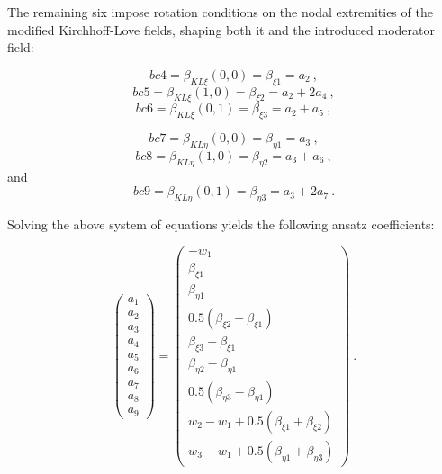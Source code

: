 The remaining six impose rotation conditions on the nodal extremities of the modified Kirchhoff-Love fields, shaping both it and the introduced moderator field:

\begin{equation} 
bc4 = \beta_{KL \xi}(0,0) = \beta_{\xi 1} = a_2
\label{eqDSGc3_14}\ ,
\end{equation}
\begin{equation} 
bc5 = \beta_{KL \xi}(1,0) = \beta_{\xi 2} = a_2 + 2a_4
\label{eqDSGc3_15}\ ,
\end{equation}
\begin{equation} 
bc6 = \beta_{KL \xi}(0,1) = \beta_{\xi 3} = a_2 + a_5
\label{eqDSGc3_16}\ ,
\end{equation}

\begin{equation} 
bc7 = \beta_{KL \eta}(0,0) = \beta_{\eta 1} = a_3
\label{eqDSGc3_17}\ ,
\end{equation}
\begin{equation} 
bc8 = \beta_{KL \eta}(1,0) = \beta_{\eta 2} = a_3 + a_6
\label{eqDSGc3_18}\ ,
\end{equation}
and
\begin{equation} 
bc9 = \beta_{KL \eta}(0,1) = \beta_{\eta 3} = a_3 + 2a_7
\label{eqDSGc3_19}\ .
\end{equation}

Solving the above system of equations yields the following ansatz coefficients:

\begin{equation} 
\begin{pmatrix}
a_1 \\
a_2 \\
a_3 \\
a_4 \\
a_5 \\
a_6 \\
a_7 \\
a_8 \\
a_9
\end{pmatrix}
=
\begin{pmatrix}
-w_1 \\
\beta_{\xi 1} \\
\beta_{\eta 1} \\
0.5(\beta_{\xi 2} - \beta_{\xi 1}) \\
\beta_{\xi 3} - \beta_{\xi 1} \\
\beta_{\eta 2} - \beta_{\eta 1} \\
0.5(\beta_{\eta 3} - \beta_{\eta 1}) \\
w_2 - w_1 + 0.5(\beta_{\xi 1} + \beta_{\xi 2}) \\
w_3 - w_1 + 0.5(\beta_{\eta 1} + \beta_{\eta 3}) 
\end{pmatrix}
\label{eqDSGc3_20}\ .
\end{equation}

